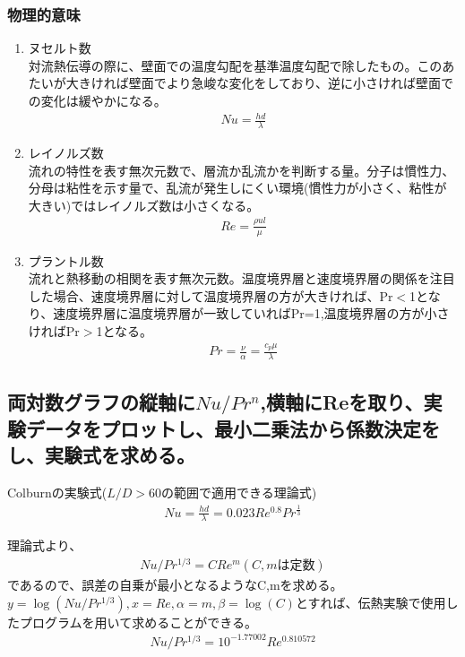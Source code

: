 \documentclass[a4j,twoside,openright,11pt]{jarticle}
\begin{document}
\subsubsection{物理的意味}
\begin{enumerate}
\item ヌセルト数\\
対流熱伝導の際に、壁面での温度勾配を基準温度勾配で除したもの。このあたいが大きければ壁面でより急峻な変化をしており、逆に小さければ壁面での変化は緩やかになる。
\begin{eqnarray}
Nu = \frac{hd}{\lambda}
\end{eqnarray}
\item レイノルズ数\\
流れの特性を表す無次元数で、層流か乱流かを判断する量。分子は慣性力、分母は粘性を示す量で、乱流が発生しにくい環境(慣性力が小さく、粘性が大きい)ではレイノルズ数は小さくなる。
\begin{eqnarray}
Re = \frac{\rho u l}{\mu}
\end{eqnarray}
\item プラントル数\\
流れと熱移動の相関を表す無次元数。温度境界層と速度境界層の関係を注目した場合、速度境界層に対して温度境界層の方が大きければ、Pr$<$1となり、速度境界層に温度境界層が一致していればPr=1,温度境界層の方が小さければPr$>$1となる。
\begin{eqnarray}
Pr = \frac{\nu}{\alpha} =\frac{c_p\mu}{\lambda}
\end{eqnarray}
\end{enumerate}

\subsection{両対数グラフの縦軸に$Nu/Pr^n$,横軸にReを取り、実験データをプロットし、最小二乗法から係数決定をし、実験式を求める。}
Colburnの実験式($L/D>60$の範囲で適用できる理論式)
\begin{eqnarray}
Nu = \frac{hd}{\lambda} =0.023Re^{0.8}Pr^{\frac{1}{3}}
\end{eqnarray}

理論式より、
\begin{eqnarray}
Nu/Pr^{1/3}=CRe^m (C,mは定数)\nonumber
\end{eqnarray}
であるので、誤差の自乗が最小となるようなC,mを求める。$y=\log (Nu/Pr^{1/3}),x=Re,\alpha = m,\beta = \log(C)$とすれば、伝熱実験で使用したプログラムを用いて求めることができる。
\begin{eqnarray}
  Nu/Pr^{1/3}=10^{-1.77002}Re^{0.810572}
\end{eqnarray}
\end{document}
